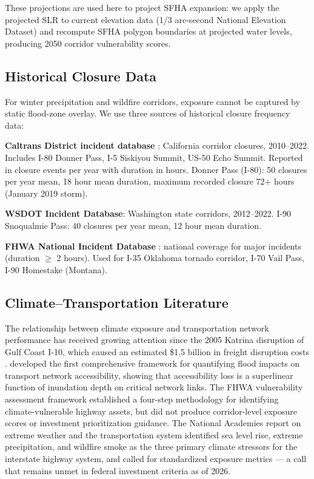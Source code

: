These projections are used here to project SFHA expansion: we apply the projected SLR to
current elevation data (1/3 arc-second National Elevation Dataset) and recompute SFHA
polygon boundaries at projected water levels, producing 2050 corridor vulnerability scores.

\subsection{Historical Closure Data}

For winter precipitation and wildfire corridors, exposure cannot be captured by static
flood-zone overlay. We use three sources of historical closure frequency data:

\textbf{Caltrans District incident database} \citep{Caltrans2023}: California corridor
closures, 2010--2022. Includes I-80 Donner Pass, I-5 Siskiyou Summit, US-50 Echo Summit.
Reported in closure events per year with duration in hours. Donner Pass (I-80): 50 closures
per year mean, 18 hour mean duration, maximum recorded closure 72+ hours (January 2019 storm).

\textbf{WSDOT Incident Database}: Washington state corridors, 2012--2022. I-90 Snoqualmie
Pass: 40 closures per year mean, 12 hour mean duration.

\textbf{FHWA National Incident Database} \citep{FHWA_incident2022}: national coverage for
major incidents (duration $\geq$ 2 hours). Used for I-35 Oklahoma tornado corridor, I-70
Vail Pass, I-90 Homestake (Montana).

\subsection{Climate--Transportation Literature}

The relationship between climate exposure and transportation network performance has received
growing attention since the 2005 Katrina disruption of Gulf Coast I-10, which caused an
estimated \$1.5 billion in freight disruption costs \citep{FHWA_incident2022}.
\citet{pregnolato2017impact} developed the first comprehensive framework for quantifying
flood impacts on transport network accessibility, showing that accessibility loss is a
superlinear function of inundation depth on critical network links. The FHWA vulnerability
assessment framework \citep{FHWA_vulnerability2012} established a four-step methodology
for identifying climate-vulnerable highway assets, but did not produce corridor-level
exposure scores or investment prioritization guidance. The National Academies report on
extreme weather and the transportation system \citep{NationalAcademies2016} identified sea
level rise, extreme precipitation, and wildfire smoke as the three primary climate stressors
for the interstate highway system, and called for standardized exposure metrics --- a call
that remains unmet in federal investment criteria as of 2026.

